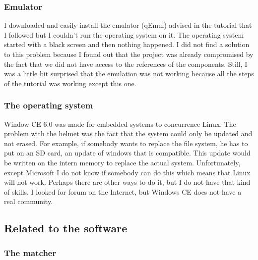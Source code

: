 	\subsubsection{Emulator}
	
	\par I downloaded and easily install the emulator (qEmul) advised in the tutorial that I followed but I couldn't run the operating system on it. The operating system started with a black screen and then nothing happened. I did not find a solution to this problem because I found out that the project was already compromised by the fact that we did not have access to the references of the components. Still, I was a little bit surprised that the emulation was not working because all the steps of the tutorial was working except this one.
	
	\subsubsection{The operating system}
	
	\par Window CE 6.0 was made for embedded systems to concurrence Linux. The problem with the helmet was the fact that the system could only be updated and not erased. For example, if somebody wants to replace the file system, he has to put on an SD card, an update of windows that is compatible. This update would be written on the intern memory to replace the actual system. Unfortunately, except Microsoft I do not know if somebody can do this which means that Linux will not work. Perhaps there are other ways to do it, but I do not have that kind of skills. I looked for forum on the Internet, but Windows CE does not have a real community.
	
	\subsection{Related to the software}
	
	\subsubsection{The matcher}
	
